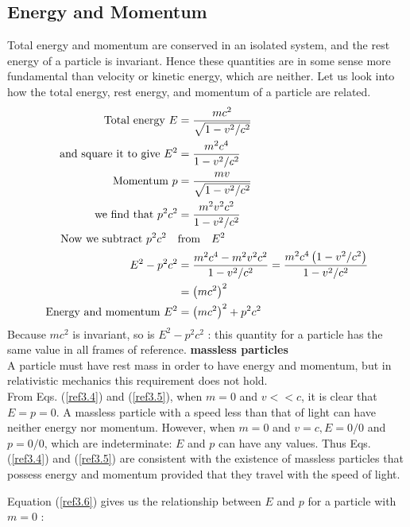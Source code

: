  \subsection{Energy and Momentum}
 Total energy and momentum are conserved in an isolated system, and the rest energy of a particle is invariant. Hence these quantities are in some sense more fundamental than velocity or kinetic energy, which are neither. Let us look into how the total energy, rest energy, and momentum of a particle are related.
 \begin{align}
  \text { Total energy } 
 E&=\frac{m c^{2}}{\sqrt{1-v^{2} / c^{2}}} \label{ref3.4}\\
 \text{ and square it to give } 
 E^{2}&=\frac{m^{2} c^{4}}{1-v^{2} / c^{2}}\notag\\
\text{Momentum }  p&=\frac{m v}{\sqrt{1-v^{2} / c^{2}}} \label{ref3.5}\\
\text{we find that }  p^{2} c^{2}&=\frac{m^{2} v^{2} c^{2}}{1-v^{2} / c^{2}} \notag\\
\text{Now we subtract }  p^{2} c^{2}\quad & \text{from} \quad E^{2} \notag \\
E^{2}-p^{2} c^{2} &=\frac{m^{2} c^{4}-m^{2} v^{2} c^{2}}{1-v^{2} / c^{2}}=\frac{m^{2} c^{4}\left(1-v^{2} / c^{2}\right)}{1-v^{2} / c^{2}} \notag \\
&=\left(m c^{2}\right)^{2}\notag\\
\text{Energy and momentum } 
E^{2}&=\left(m c^{2}\right)^{2}+p^{2} c^{2} \label{ref3.6}
 \end{align}
  Because $m c^{2}$ is invariant, so is $E^{2}-p^{2} c^{2}$ : this quantity for a particle has the same value in all frames of reference.
\textbf{massless particles}\\
 A particle must have rest mass in order to have energy and momentum, but in relativistic mechanics this requirement does not hold.\\
 From Eqs. (\ref{ref3.4}) and (\ref{ref3.5}), when $m=0$ and $v<< c$, it is clear that $E=p=0$. A massless particle with a speed less than that of light can have neither energy nor momentum. However, when $m=0$ and $v=c, E=0 / 0$ and $p=0 / 0$, which are indeterminate: $E$ and $p$ can have any values. Thus Eqs. (\ref{ref3.4}) and (\ref{ref3.5}) are consistent with the existence of massless particles that possess energy and momentum provided that they travel with the speed of light.
 
 Equation (\ref{ref3.6}) gives us the relationship between $E$ and $p$ for a particle with $m=0$ :\\
 
